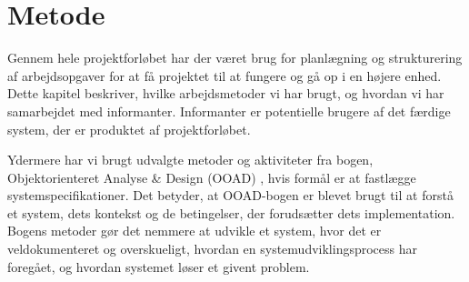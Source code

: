\chapter{Metode}
\label{chap:metode}

Gennem hele projektforløbet har der været brug for planlægning og strukturering af arbejdsopgaver for at få projektet til at fungere og gå op i en højere enhed. Dette kapitel beskriver, hvilke arbejdsmetoder vi har brugt, og hvordan vi har samarbejdet med informanter. Informanter er potentielle brugere af det færdige system, der er produktet af projektforløbet.

Ydermere har vi brugt udvalgte metoder og aktiviteter fra bogen, Objektorienteret Analyse \& Design (OOAD) \cite{ooad}, hvis formål er at fastlægge systemspecifikationer. Det betyder, at OOAD-bogen er blevet brugt til at forstå et system, dets kontekst og de betingelser, der forudsætter dets implementation. Bogens metoder gør det nemmere at udvikle et system, hvor det er veldokumenteret og overskueligt, hvordan en systemudviklingsprocess har foregået, og hvordan systemet løser et givent problem.




